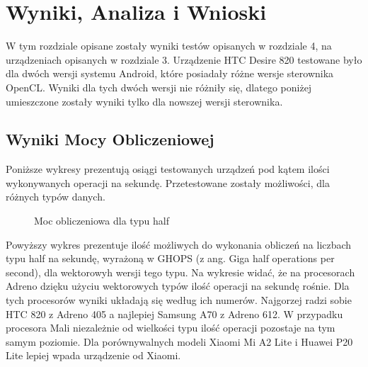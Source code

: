 \section[Wyniki, Analiza i Wnioski]{Wyniki, Analiza i Wnioski}
W tym rozdziale opisane zostały wyniki testów opisanych w rozdziale 4, na urządzeniach opisanych w rozdziale 3. Urządzenie HTC Desire 820 testowane było dla dwóch wersji systemu Android, które posiadały różne wersje sterownika OpenCL. Wyniki dla tych dwóch wersji nie różniły się, dlatego poniżej umieszczone zostały wyniki tylko dla nowszej wersji sterownika.
\subsection[Wyniki Mocy Obliczeniowej]{Wyniki Mocy Obliczeniowej}
Poniższe wykresy prezentują osiągi testowanych urządzeń pod kątem ilości wykonywanych operacji na sekundę. Przetestowane zostały możliwości, dla różnych typów danych.
\begin{figure}[H]
\caption{Moc obliczeniowa dla typu half}
\end{figure}
Powyższy wykres prezentuje ilość możliwych do wykonania obliczeń na liczbach typu half na sekundę, wyrażoną w GHOPS (z ang. Giga half operations per second), dla wektorowyh wersji tego typu. Na wykresie widać, że na procesorach Adreno dzięku użyciu wektorowych typów ilość operacji na sekundę rośnie. Dla tych procesorów wyniki układają się według ich numerów. Najgorzej radzi sobie HTC 820 z Adreno 405 a najlepiej Samsung A70 z Adreno 612. W przypadku procesora Mali niezależnie od wielkości typu ilość operacji pozostaje na tym samym poziomie. Dla porównywalnych modeli Xiaomi Mi A2 Lite i Huawei P20 Lite lepiej wpada urządzenie od Xiaomi.

